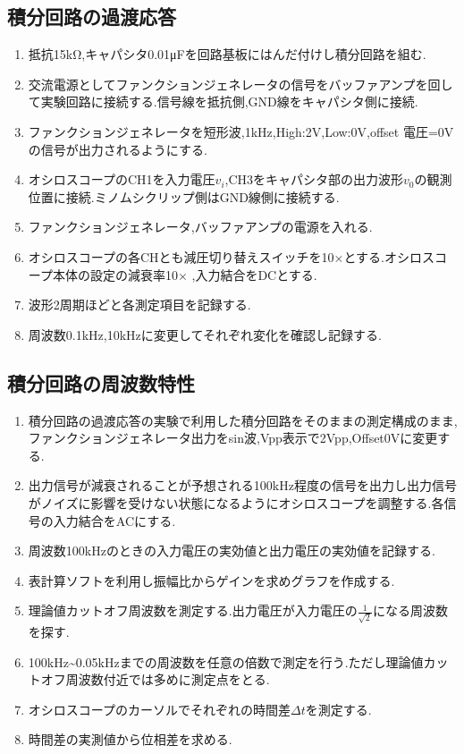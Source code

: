 \documentclass[a4j,10pt,dvipdfmx]{jarticle}
\begin{document}
\subsection{積分回路の過渡応答}
\begin{enumerate}
  \item 抵抗15kΩ,キャパシタ0.01μFを回路基板にはんだ付けし積分回路を組む.
  \item 交流電源としてファンクションジェネレータの信号をバッファアンプを回して実験回路に接続する.信号線を抵抗側,GND線をキャパシタ側に接続.
  \item ファンクションジェネレータを短形波,1kHz,High:2V,Low:0V,offset 電圧=0Vの信号が出力されるようにする.
  \item オシロスコープのCH1を入力電圧$v_i$,CH3をキャパシタ部の出力波形$v_0$の観測位置に接続.ミノムシクリップ側はGND線側に接続する.
  \item ファンクションジェネレータ,バッファアンプの電源を入れる.
  \item オシロスコープの各CHとも減圧切り替えスイッチを10$\times$とする.オシロスコープ本体の設定の減衰率10$\times$ ,入力結合をDCとする.
  \item 波形2周期ほどと各測定項目を記録する.
  \item 周波数0.1kHz,10kHzに変更してそれぞれ変化を確認し記録する.
\end{enumerate}
\subsection{積分回路の周波数特性}
\begin{enumerate}
  \item 積分回路の過渡応答の実験で利用した積分回路をそのままの測定構成のまま,ファンクションジェネレータ出力をsin波,Vpp表示で2Vpp,Offset0Vに変更する.
  \item 出力信号が減衰されることが予想される100kHz程度の信号を出力し出力信号がノイズに影響を受けない状態になるようにオシロスコープを調整する.各信号の入力結合をACにする.
  \item 周波数100kHzのときの入力電圧の実効値と出力電圧の実効値を記録する.
  \item 表計算ソフトを利用し振幅比からゲインを求めグラフを作成する.
  \item 理論値カットオフ周波数を測定する.出力電圧が入力電圧の$\frac{1}{\sqrt{2}}$になる周波数を探す.
  \item 100kHz\textasciitilde0.05kHzまでの周波数を任意の倍数で測定を行う.ただし理論値カットオフ周波数付近では多めに測定点をとる.
  \item オシロスコープのカーソルでそれぞれの時間差$\Delta t$を測定する.
  \item 時間差の実測値から位相差を求める.
\end{enumerate}
\end{document}
